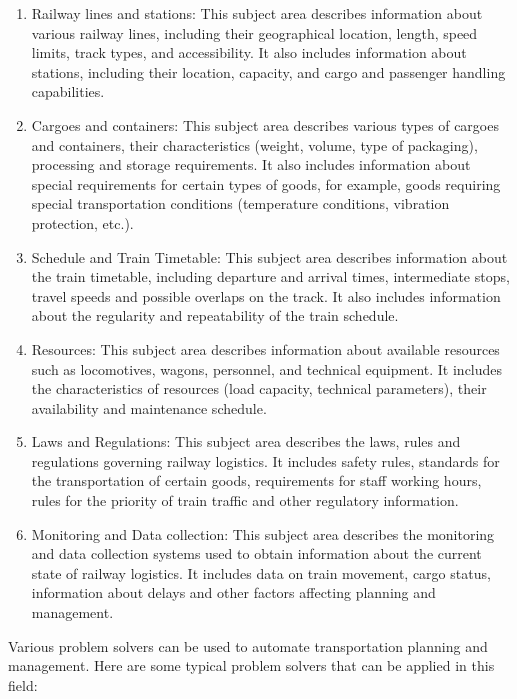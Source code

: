 \documentclass[a4paper]{article}
\begin{document}
\setcounter{page}{186}
\begin{multicols}{2}

\begin{enumerate}[label=\arabic*)]
\itemsep=-1.5mm
\item Railway lines and stations: This subject area describes information about various railway lines,
including their geographical location, length, speed
limits, track types, and accessibility. It also includes information about stations, including their location, capacity, and cargo and passenger handling capabilities.
\item Cargoes and containers: This subject area describes various types of cargoes and containers, their characteristics (weight, volume, type of packaging), processing and storage requirements. It also includes information about special requirements for
certain types of goods, for example, goods requiring special transportation conditions (temperature conditions, vibration protection, etc.).
 \item Schedule and Train Timetable: This subject area
describes information about the train timetable,
including departure and arrival times, intermediate stops, travel speeds and possible overlaps on
the track. It also includes information about the
regularity and repeatability of the train schedule.
\item Resources: This subject area describes information about available resources such as locomotives, wagons, personnel, and technical equipment.
It includes the characteristics of resources (load capacity, technical parameters), their availability and maintenance schedule.
\item Laws and Regulations: This subject area describes
the laws, rules and regulations governing railway
logistics. It includes safety rules, standards for the
transportation of certain goods, requirements for
staff working hours, rules for the priority of train
traffic and other regulatory information.
\item Monitoring and Data collection: This subject area
describes the monitoring and data collection systems used to obtain information about the current
state of railway logistics. It includes data on train
movement, cargo status, information about delays
and other factors affecting planning and management.
\end{enumerate}

\par Various problem solvers can be used to automate
transportation planning and management. Here are some
typical problem solvers that can be applied in this field:


\end{multicols}
\end{document}
